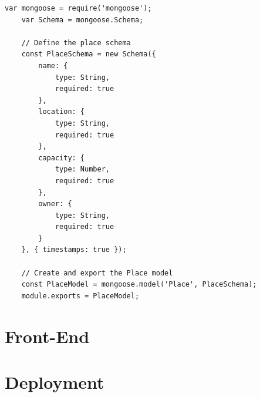 \documentclass[9pt]{extarticle}
\begin{document}
\begin{lstlisting}[style=jscode, caption={Modello per i luoghi.}, label={lst:places}]
	var mongoose = require('mongoose');
	var Schema = mongoose.Schema;
	
	// Define the place schema
	const PlaceSchema = new Schema({
		name: {
			type: String,
			required: true
		},
		location: {
			type: String,
			required: true
		},
		capacity: {
			type: Number,
			required: true
		},
		owner: {
			type: String,
			required: true
		}
	}, { timestamps: true });
	
	// Create and export the Place model
	const PlaceModel = mongoose.model('Place', PlaceSchema);
	module.exports = PlaceModel;
\end{lstlisting}
	
\section{Front-End}

\section{Deployment}

	
\end{document}
